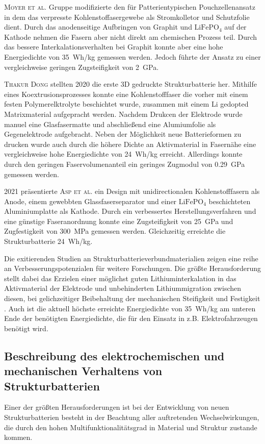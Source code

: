 \textsc{Moyer et al.} \cite{Moyer2020} Gruppe modifizierte den für Patterientypischen Pouchzellenansatz in dem das verpresste Kohlenstoffasergewebe als Stromkolletor und Schutzfolie dient. Durch das anodenseitige Aufbringen von Graphit und $\text{LiFePO}_\text{4}$ auf der Kathode nehmen die Fasern aber nicht direkt am chemischen Prozess teil. Durch das bessere Interkalationsverhalten bei Graphit konnte aber eine hohe Energiedichte von 35~Wh/kg gemessen werden. Jedoch führte der Ansatz zu einer vergleichweise geringen Zugsteifigkeit von 2~GPa.

\textsc{Thakur Dong} \cite{Thakur2020} stellten 2020 die erste 3D gedruckte Strukturbatterie her. Mithilfe eines Koextrusionsprozesses konnte eine Kohlenstofffaser die vorher mit einem festen Polymerelktrolyte beschichtet wurde, zusammen mit einem Li gedopted Matrixmaterial aufgepracht werden. Nachdem Drukcen der Elektrode wurde manuel eine Glasfasermatte und abschließend eine Alumiumfolie als Gegenelektrode aufgebracht. Neben der Möglichkeit neue Batterieformen zu drucken wurde auch durch die höhere Dichte an Aktivmaterial in Fasernähe eine vergleichweise hohe Energiedichte von 24~Wh/kg erreicht. Allerdings konnte durch den geringen Faservolumenanteil ein geringes Zugmodul von 0.29~GPa gemessen werden.

2021 präsentierte \textsc{Asp et al.} \cite{Asp2021} ein Design mit unidirectionalen Kohlenstofffasern als Anode, einem gewebbten Glassfaserseparator und einer $\text{LiFePO}_\text{4}$ beschichteten Aluminiumplatte als Kathode. Durch ein verbessertes Herstellungsverfahren und eine günstige Faseranordnung konnte eine Zugsteifigkeit von 25~GPa und Zugfestigkeit von 300~MPa gemessen werden. Gleichzeitig erreichte die Strukturbatterie 24~Wh/kg.

Die exitierenden Studien an Strukturbatterieverbundmaterialien zeigen eine reihe an Verbesserungspotenzialen für weitere Forschungen. Die größte Herausforderung stellt dabei das Erzielen einer möglichst guten Lithiuminterkalation in das Aktivmaterial der Elektrode und unbehinderten Lithiummigration zwischen diesen, bei gelichzeitiger Beibehaltung der mechanischen Steifigkeit und Festigkeit \cite{Asp2015}.
Auch ist die aktuell höchste erreichte Energiedichte von 35~Wh/kg am unteren Ende der benötigten Energiedichte, die für den Einsatz in z.B. Elektrofahrzeugen benötigt wird.

\subsection{Beschreibung des elektrochemischen und mechanischen Verhaltens von Strukturbatterien}
Einer der größten Herausforderungen ist bei der Entwicklung von neuen Strukturbatterien besteht in der Beachtung aller auftretenden Wechselwirkungen, die durch den hohen Multifunktionalitätsgrad in Material und Struktur zustande kommen.

